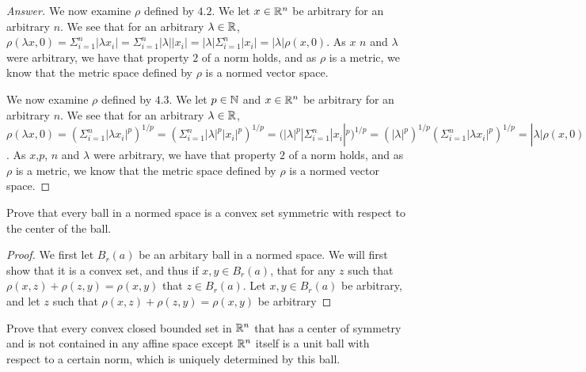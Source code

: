 \begin{proof}[Answer]
  We now examine $\rho$ defined by $4.2$. 
  We let $x\in \mathbb{R}^n$ be arbitrary for an arbitrary $n$. We see that 
  for an arbitrary $\lambda \in \mathbb{R}$, $\rho(\lambda x,0)=
  \Sigma_{i=1}^n|\lambda x_i| =
  \Sigma_{i=1}^n |\lambda| | x_i|=
  |\lambda| \Sigma_{i=1}^n | x_i|=
  |\lambda| \rho(x,0)$. As $x$  $n$ and $\lambda$ were arbitrary,
  we have that property $2$ of a norm holds, and as $\rho$ is a
  metric, we know that the metric space defined by $\rho$ is a normed
  vector space. 

  We now examine $\rho$ defined by $4.3$. 
  We let $p\in \mathbb{N}$ and $x\in \mathbb{R}^n$ be arbitrary
  for an arbitrary $n$. We see that 
  for an arbitrary $\lambda \in \mathbb{R}$, $\rho(\lambda x,0)=
  (\Sigma_{i=1}^n |\lambda x_i|^p)^{1/p} =
  (\Sigma_{i=1}^n |\lambda|^p |x_i|^p)^{1/p} =
 ( |\lambda|^p|\Sigma_{i=1}^n |x_i|^p)^{1/p} =
 ( |\lambda|^p)^{1/p}(\Sigma_{i=1}^n |\lambda x_i|^p)^{1/p} =
  |\lambda| \rho(x,0)$. As $x$,$p$, $n$ and $\lambda$ were arbitrary,
  we have that property $2$ of a norm holds, and as $\rho$ is a
  metric, we know that the metric space defined by $\rho$ is a normed
  vector space. 
\end{proof}

\begin{minorEx}%
    Prove that every ball in a normed space is a convex set symmetric with
    respect to the center of the ball.
\end{minorEx}

\begin{proof}
  We first let $B_r(a)$ be an arbitary ball in a normed space. We will
  first show that it is a convex set, and thus if $x,y\in B_r(a)$,
  that for any $z$ such that $\rho(x,z)+\rho(z,y)=\rho(x,y)$
  that $z\in B_r(a)$. Let $x,y\in B_r(a)$ be arbitrary, and let $z$
  such that $\rho(x,z)+\rho(z,y)=\rho(x,y)$ be arbitrary
\end{proof}

\begin{minorEx}
    Prove that every convex closed bounded set in $\mathbb{R}^n$ that has a center of
    symmetry and is not contained in any affine space except $\mathbb{R}^n$ itself is a
    unit ball with respect to a certain norm, which is uniquely determined by
    this ball.
\end{minorEx}

